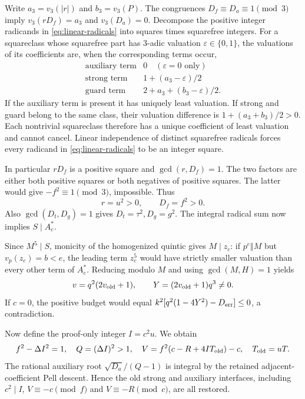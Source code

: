Write $a_3=v_3(|r|)$ and $b_3=v_3(P)$. The congruences
$D_f\equiv D_a\equiv1\pmod3$ imply
$v_3(rD_f)=a_3$ and $v_3(D_a)=0$.
Decompose the positive integer radicands in
\eqref{eq:linear-radicals} into squares times squarefree integers.
For a squareclass whose squarefree part has $3$-adic valuation
$\varepsilon\in\{0,1\}$, the valuations of its coefficients are,
when the corresponding terms occur,
\[
 \begin{array}{c|c}
 \text{auxiliary term}&0\quad(\varepsilon=0\text{ only})\\
 \text{strong term}&1+(a_3-\varepsilon)/2\\
 \text{guard term}&2+a_3+(b_3-\varepsilon)/2.
 \end{array}
\]
If the auxiliary term is present it has uniquely least valuation.
If strong and guard belong to the same class, their valuation difference
is $1+(a_3+b_3)/2>0$. Each nontrivial squareclass therefore has a unique
coefficient of least valuation and cannot cancel. Linear independence
of distinct squarefree radicals forces every radicand in
\eqref{eq:linear-radicals} to be an integer square.

In particular $rD_f$ is a positive square and $\gcd(r,D_f)=1$.
The two factors are either both positive squares or both negatives of
positive squares. The latter would give $-f^2\equiv1\pmod3$, impossible.
Thus
\begin{equation}
 r=u^2>0,\qquad D_f=f^2>0. \label{eq:linear-recovery}
\end{equation}
Also $\gcd(D_t,D_g)=1$ gives $D_t=\tau^2,D_g=g^2$.
The integral radical sum now implies $S\mid A_c^{\ast}$.

Since $M^5\mid S$, monicity of the homogenized quintic gives $M\mid z_c$:
if $p^e\Vert M$ but $v_p(z_c)=b<e$, the leading term $z_c^5$ would have
strictly smaller valuation than every other term of $A_c^{\ast}$.
Reducing modulo $M$ and using $\gcd(M,H)=1$ yields
\[
 v=q^2(2v_{\rm old}+1),\qquad Y=(2v_{\rm old}+1)q^3\ne0.
\]
If $c=0$, the positive budget would equal
$k^2[q^2(1-4Y^2)-D_{\rm err}]\le0$, a contradiction.

Now define the proof-only integer $I=c^2u$. We obtain
\[
 f^2-\Delta I^2=1,\quad Q=(\Delta I)^2>1,\quad
 V=f^2(c-R+4IT_{\rm old})-c,\quad T_{\rm old}=uT.
\]
The rational auxiliary root $\sqrt{D_a}/(Q-1)$ is integral by the
retained adjacent-coefficient Pell descent. Hence the old strong and
auxiliary interfaces, including $c^2\mid I$,
$V\equiv-c\pmod f$ and $V\equiv-R\pmod c$, are all restored.

